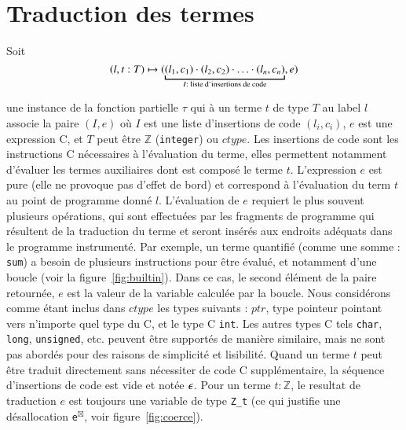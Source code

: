 \section{Traduction des termes \eacsl}
\label{sec:term}



Soit
\[
(l, t:T) \rulearrow (\underbracket{(l_1, c_1) \concat (l_2, c_2) \concat \ldots
  \concat (l_n, c_n)}_{I : \text{ liste d'insertions de code}}, e)
\]

une instance de la fonction partielle $\tau$ qui à un terme \eacsl $t$ de type
$T$ au label $l$ associe la paire $(I, e)$ où $I$ est une liste d'insertions de
code $(l_i, c_i)$, $e$ est une expression C, et $T$ peut être $\mathbb{Z}$
(\lstinline'integer') ou $ctype$.
Les insertions de code sont les instructions C nécessaires à l'évaluation du
terme, elles permettent notamment d'évaluer les termes auxiliaires dont est
composé le terme $t$.
L'expression $e$ est pure (elle ne provoque pas d'effet de bord) et correspond
à l'évaluation du term $t$ au point de programme donné $l$.
L'évaluation de $e$ requiert le plus souvent plusieurs opérations, qui sont
effectuées par les fragments de programme qui résultent de la traduction du
terme et seront insérés aux endroits adéquats dans le programme instrumenté.
Par exemple, un terme quantifié (comme une somme : \lstinline'sum') a besoin de
plusieurs instructions pour être évalué, et notamment d'une boucle (voir la
figure~\ref{fig:builtin}).
Dans ce cas, le second élément de la paire retournée, $e$ est la valeur de la
variable calculée par la boucle.
Nous considérons comme étant inclus dans $ctype$ les types suivants : $ptr$,
type pointeur pointant vers n'importe quel type du C, et le type C
\lstinline'int'.
Les autres types C tels \lstinline'char', \lstinline'long',
\lstinline'unsigned', etc. peuvent être supportés de manière similaire, mais ne
sont pas abordés pour des raisons de simplicité et lisibilité.
Quand un terme $t$ peut être traduit directement sans nécessiter de code C
supplémentaire, la séquence d'insertions de code est vide et notée $\epsilon$.
Pour un terme $t:\mathbb{Z}$, le resultat de traduction $e$ est toujours une
variable de type \lstinline'Z_t' (ce qui justifie une désallocation
\lstinline{e}${}^{\boxtimes}$, voir figure~\ref{fig:coerce}).

